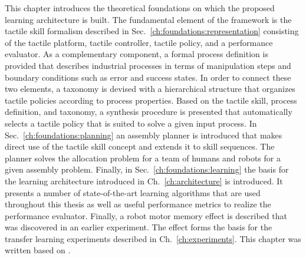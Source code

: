 This chapter introduces the theoretical foundations on which the proposed learning architecture is built.
The fundamental element of the framework is the tactile skill formalism described in Sec.~\ref{ch:foundations:representation} consisting of the tactile platform, tactile controller, tactile policy, and a performance evaluator.
As a complementary component, a formal process definition is provided that describes industrial processes in terms of manipulation steps and boundary conditions such as error and success states.
In order to connect these two elements, a taxonomy is devised with a hierarchical structure that organizes tactile policies according to process properties.
Based on the tactile skill, process definition, and taxonomy, a synthesis procedure is presented that automatically selects a tactile policy that is suited to solve a given input process.
In Sec.~\ref{ch:foundations:planning} an assembly planner is introduced that makes direct use of the tactile skill concept and extends it to skill sequences. The planner solves the allocation problem for a team of humans and robots for a given assembly problem.
Finally, in Sec.~\ref{ch:foundations:learning} the basis for the learning architecture introduced in Ch.~\ref{ch:architecture} is introduced.
It presents a number of state-of-the-art learning algorithms that are used throughout this thesis as well as useful performance metrics to realize the performance evaluator.
Finally, a robot motor memory effect is described that was discovered in an earlier experiment. The effect forms the basis for the transfer learning experiments described in Ch.~\ref{ch:experiments}.
This chapter was written based on \cite{Johannsmeier.2017,Johannsmeier.2019,Johannsmeier.2023,Johannsmeier.2023b}.